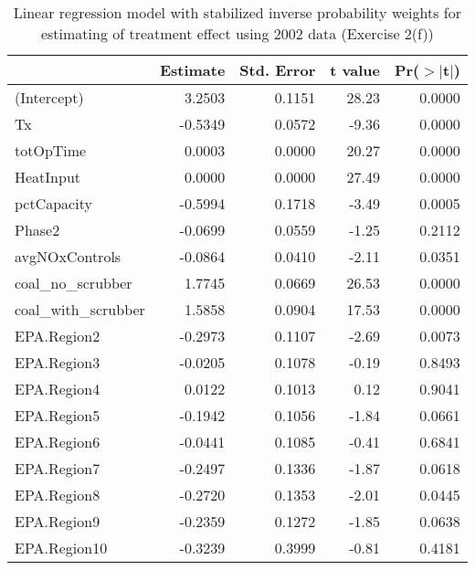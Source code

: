\begin{table}[ht]
\centering
\begin{tabular}{lrrrr}
  \toprule
 & Estimate & Std. Error & t value & Pr($>$$|$t$|$) \\ 
  \midrule
(Intercept) & 3.2503 & 0.1151 & 28.23 & 0.0000 \\ 
  Tx & -0.5349 & 0.0572 & -9.36 & 0.0000 \\ 
  totOpTime & 0.0003 & 0.0000 & 20.27 & 0.0000 \\ 
  HeatInput & 0.0000 & 0.0000 & 27.49 & 0.0000 \\ 
  pctCapacity & -0.5994 & 0.1718 & -3.49 & 0.0005 \\ 
  Phase2 & -0.0699 & 0.0559 & -1.25 & 0.2112 \\ 
  avgNOxControls & -0.0864 & 0.0410 & -2.11 & 0.0351 \\ 
  coal\_no\_scrubber & 1.7745 & 0.0669 & 26.53 & 0.0000 \\ 
  coal\_with\_scrubber & 1.5858 & 0.0904 & 17.53 & 0.0000 \\ 
  EPA.Region2 & -0.2973 & 0.1107 & -2.69 & 0.0073 \\ 
  EPA.Region3 & -0.0205 & 0.1078 & -0.19 & 0.8493 \\ 
  EPA.Region4 & 0.0122 & 0.1013 & 0.12 & 0.9041 \\ 
  EPA.Region5 & -0.1942 & 0.1056 & -1.84 & 0.0661 \\ 
  EPA.Region6 & -0.0441 & 0.1085 & -0.41 & 0.6841 \\ 
  EPA.Region7 & -0.2497 & 0.1336 & -1.87 & 0.0618 \\ 
  EPA.Region8 & -0.2720 & 0.1353 & -2.01 & 0.0445 \\ 
  EPA.Region9 & -0.2359 & 0.1272 & -1.85 & 0.0638 \\ 
  EPA.Region10 & -0.3239 & 0.3999 & -0.81 & 0.4181 \\ 
   \bottomrule
\end{tabular}
\caption{Linear regression model with stabilized inverse probability
  weights for estimating of treatment effect using 2002 data (Exercise
  2(f))}
\label{tab:lm-2f-02}
\end{table}

